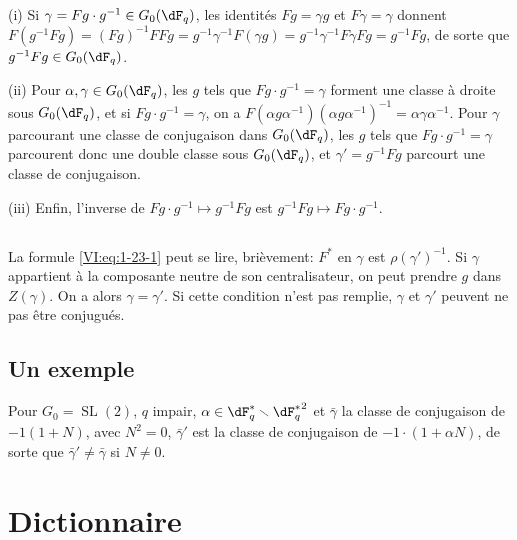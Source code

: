 \documentclass[oneside]{book}
\renewcommand{\setminus}{\smallsetminus}
\theoremstyle{sga-source}
\theoremstyle{sga-source-dash}
\theoremstyle{sga-source-dotdash}
\theoremstyle{sga-source-number-note-dash}
\theoremstyle{sga-source-note-number-dotdash}
\theoremstyle{sga-source-example-dotdash}
\theoremstyle{sga-source-inline-number}
\theoremstyle{sga-source-bare-number}
\theoremstyle{sga-source}
\newcommand{\PrintPage}[1]{}\newcommand{\MathPage}[1]{}\newcommand{\PrintCite}[2]{#1}\newcommand{\var}[3]{#2}
\begin{document}
\PrintPage{182}
(i) Si $\gamma= F g\cdot g^{-1}\in G_0(\dF_q)$, les identités $F g=\gamma g$ 
et 
$F\gamma=\gamma$ donnent $F(g^{-1} F g) = (F g)^{-1} F F g = g^{-1} \gamma^{-1} F(\gamma g) = g^{-1} \gamma^{-1} F \gamma F g = g^{-1} F g$, 
de sorte que $g^{-1} F g \in G_0(\dF_q)$. 

(ii) Pour $\alpha,\gamma\in G_0(\dF_q)$, les $g$ tels que 
$F g\cdot g^{-1} = \gamma$ forment une classe à droite sous $G_0(\dF_q)$, et 
si $F g\cdot g^{-1} = \gamma$, on a 
$F(\alpha g \alpha^{-1})(\alpha g \alpha^{-1})^{-1} = \alpha \gamma\alpha^{-1}$. 
Pour $\gamma$ parcourant une classe de conjugaison dans $G_0(\dF_q)$, les $g$ 
tels que $F g\cdot g^{-1} = \gamma$ parcourent donc une double classe sous 
$G_0(\dF_q)$, et $\gamma'= g^{-1} F g$ parcourt une classe de conjugaison. 

(iii) Enfin, l'inverse de $F g\cdot g^{-1}\mapsto g^{-1} F g$ est 
$g^{-1} F g\mapsto F g\cdot g^{-1}$. 





\subsection{}\label{VI:1-25}

La formule \eqref{VI:eq:1-23-1} peut se lire, brièvement: $F^\ast$ en 
$\gamma$ est $\rho(\gamma')^{-1}$. Si $\gamma$ appartient à la composante 
neutre de son centralisateur, on peut prendre $g$ dans $Z(\gamma)$. On a alors 
$\gamma=\gamma'$. Si cette condition n'est pas remplie, $\gamma$ et $\gamma'$ 
peuvent ne pas être conjugués. 





\subsection{Un exemple}\label{VI:1-26}

Pour $G_0=\operatorname{SL}(2)$, $q$ impair, 
$\alpha\in \dF_q^\ast\setminus {\dF_q^\ast}^2$ et $\bar\gamma$ la classe de 
conjugaison de $-1(1+N)$, avec $N^2=0$, $\bar\gamma'$ est la classe de 
conjugaison de $-1\cdot (1+\alpha N)$, de sorte que $\bar\gamma'\ne \bar\gamma$ 
si $N\ne 0$. 










\PrintPage{183}
\section{Dictionnaire}\label{VI:2}
\end{document}
